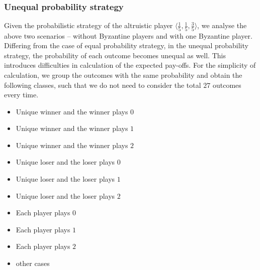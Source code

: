 \subsubsection{Unequal probability strategy}
Given the probabilistic strategy of the altruistic player $\langle \frac{1}{5},\frac{1}{5},\frac{3}{5} \rangle$, we analyse the above two scenarios -- without Byzantine players and with one Byzantine player. 
Differing from the case of equal probability strategy, in the unequal probability strategy, the probability of each outcome becomes unequal as well.
This introduces difficulties in calculation of the expected pay-offs. For the simplicity of calculation, we group the outcomes with the same probability and obtain the following classes, such that we do not need to consider the total $27$ outcomes every time.
\begin{itemize}
	\item Unique winner and the winner plays $0$
	\item Unique winner and the winner plays $1$
	\item Unique winner and the winner plays $2$
	\item Unique loser and the loser plays $0$
	\item Unique loser and the loser plays $1$
	\item Unique loser and the loser plays $2$
	\item Each player plays $0$
	\item Each player plays $1$
	\item Each player plays $2$
	\item other cases
\end{itemize}

